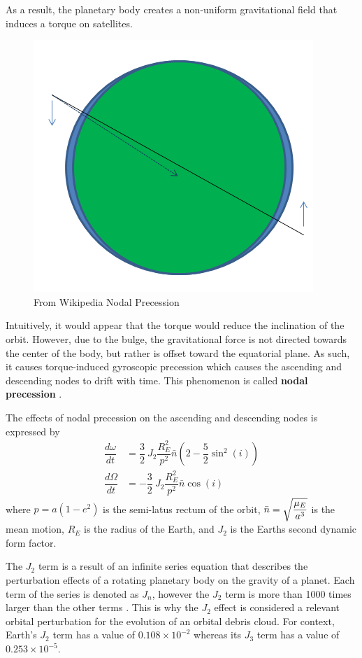 \documentclass[a4paper, 12pt]{article}
\newcommand{\lindex}[1]{%
	\lowercase{\def\temp{#1}}%
	\expandafter\index\expandafter{\temp}%
}
\newcommand{\boldindex}[1]{%
	\textbf{#1}\lindex{#1}%
}
\begin{document}
As a result, the planetary body creates a non-uniform gravitational field that induces a torque on satellites. 

\begin{figure}[h]
	\centering
	\includegraphics[scale=0.4]{Nodal_precession}
	\caption{From Wikipedia Nodal Precession}
\end{figure}

Intuitively, it would appear that the torque would reduce the inclination of the orbit. However, due to the bulge, the gravitational force is not directed towards the center of the body, but rather is offset toward the equatorial plane. As such, it causes torque-induced gyroscopic precession which causes the ascending and descending nodes to drift with time. This phenomenon is called \boldindex{nodal precession}.

The effects of nodal precession on the ascending and descending nodes is expressed by
\begin{align*}
	\dfrac{d\omega}{dt} &= \dfrac{3}{2}\:J_2\dfrac{R_E^2}{p^2}\bar{n}\left(2 - \dfrac{5}{2}\sin^2(i)\right)\\
	\dfrac{d\Omega}{dt} &= -\dfrac{3}{2}\:J_2\dfrac{R_E^2}{p^2}\bar{n}\cos(i)
\end{align*}
where $p = a(1 - e^2)$ is the semi-latus rectum of the orbit, $\bar{n}=\sqrt{\mathstrut\dfrac{\mu_E}{a^3}}$ is the mean motion, $R_E$ is the radius of the Earth, and $J_2$ is the Earths second dynamic form factor.

The $J_2$ term is a result of an infinite series equation that describes the perturbation effects of a rotating planetary body on the gravity of a planet. Each term of the series is denoted as $J_n$, however the $J_2$ term is more than 1000 times larger than the other terms \citep{J2Pertur39:online}. This is why the $J_2$ effect is considered a relevant orbital perturbation for the evolution of an orbital debris cloud. For context, Earth's  $J_2$ term has a value of $0.108 \times 10^{-2}$ whereas its $J_3$ term has a value of $0.253 \times 10^{-5}$.
\end{document}
